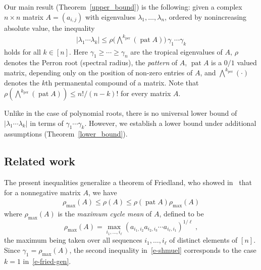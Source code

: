 \documentclass[a4paper]{amsart}
\theoremstyle{definition}
\theoremstyle{plain}
\theoremstyle{remark}
\begin{document}
Our main result (Theorem~\ref{upper_bound}) is the following:
given a complex $n \times n$ matrix $A = (a_{i,j})$ with eigenvalues $\lambda_1, \dots, \lambda_n$, ordered by nonincreasing absolute value, the inequality 
\begin{align}
	|\lambda_1 \dotsm \lambda_k| {\leqslant} \rho\big({\mbox{$\bigwedge$}}^k_\operatorname{per} (\operatorname{pat} A)\big) \,
\gamma_1 \dotsm \gamma_k 
\label{e-fried-gen}
\end{align}
holds for all $k \in [n]$.
Here $\gamma_1{\geqslant} \cdots {\geqslant} \gamma_n $ are the tropical eigenvalues of $A$,
$\rho$ denotes the Perron root (spectral radius),
the {\em pattern} of $A$, $\operatorname{pat} A$ is a $0/1$ valued matrix,
depending only on the position of non-zero entries of $A$,
and ${\mbox{$\bigwedge$}}^k_\operatorname{per}(\cdot)$ denotes the $k$th permanental compound
of a matrix. Note that $\rho({\mbox{$\bigwedge$}}^k_\operatorname{per} (\operatorname{pat} A)){\leqslant} n!/(n-k)!$ for every matrix $A$.

Unlike in the case of polynomial roots, there is no universal
lower bound of $|\lambda_1 \dotsm \lambda_k|$ in terms of
$\gamma_1\dotsm \gamma_k$. However, we establish a lower
bound under additional assumptions (Theorem~\ref{lower_bound}).

\subsection{Related work}
The present inequalities generalize a theorem of Friedland,
who showed in~\cite{friedland}  that
for a nonnegative matrix $A$, we have 
\begin{align}
\rho_{\max}(A) {\leqslant} \rho(A) {\leqslant} \rho(\operatorname{pat} A)\rho_{\max}(A)
\label{e-shmuel}
\end{align}
where $\rho_{\max}(A)$ is the \emph{maximum cycle mean} of $A$, defined 
to be
\[
	\rho_{\max}(A) = \max_{i_1,\dots,i_\ell} {\left( a_{i_1,i_2} a_{i_2,i_3} \dotsm a_{i_\ell,i_1} \right)}^{1/\ell} \; ,
\]
the maximum being taken over all sequences $i_1,\dots,i_\ell$ 
of distinct elements of $[n]$.
Since $\gamma_1=\rho_{\max}(A)$, 
the second inequality in~\eqref{e-shmuel}
corresponds to the case $k=1$ in~\eqref{e-fried-gen}.
\end{document}
